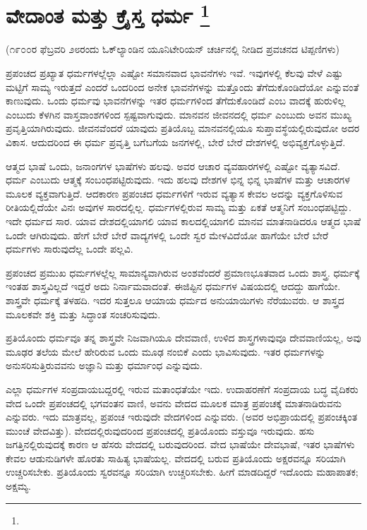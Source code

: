 
\chapter{ವೇದಾಂತ ಮತ್ತು ಕ್ರೈಸ್ತ ಧರ್ಮ \protect\footnote{}}

\begin{center}
(೧೯೦೦ರ ಫೆಬ್ರವರಿ ೨೮ರಂದು ಓಕ್‌ಲ್ಯಾಂಡಿನ ಯೂನಿಟೇರಿಯನ್ ಚರ್ಚಿನಲ್ಲಿ ನೀಡಿದ ಪ್ರವಚನದ ಟಿಪ್ಪಣಿಗಳು)
\end{center}

 ಪ್ರಪಂಚದ ಪ್ರಖ್ಯಾತ ಧರ್ಮಗಳಲ್ಲೆಲ್ಲಾ ಎಷ್ಟೋ ಸಮಾನವಾದ ಭಾವನೆಗಳು ಇವೆ. ಇವುಗಳಲ್ಲಿ ಕೆಲವು ವೇಳೆ ಎಷ್ಟು ಮಟ್ಟಿಗೆ ಸಾಮ್ಯ ಇರುತ್ತದೆ ಎಂದರೆ ಒಂದರಿಂದ ಅನೇಕ ಭಾವನೆಗಳನ್ನು ಮತ್ತೊಂದು ತೆಗೆದುಕೊಂಡಿದೆಯೋ ಎನ್ನುವಂತೆ ಕಾಣುವುದು. ಒಂದು ಧರ್ಮವು ಭಾವನೆಗಳನ್ನು ಇತರ ಧರ್ಮಗಳಿಂದ ತೆಗೆದುಕೊಂಡಿದೆ ಎಂಬ ವಾದಕ್ಕೆ ಹುರುಳಿಲ್ಲ ಎಂಬುದು ಕೆಳಗಿನ ವಾಸ್ತವಾಂಶಗಳಿಂದ ಸ್ಪಷ್ಟವಾಗುವುದು. ಮಾನವನ ಜೀವನದಲ್ಲಿ ಧರ್ಮ ಎಂಬುದು ಅವನ ಮುಖ್ಯ ಪ್ರವೃತ್ತಿಯಾಗಿರುವುದು. ಜೀವನವೆಂದರೆ ಯಾವುದು ಪ್ರತಿಯೊಬ್ಬ ಮಾನವನಲ್ಲಿಯೂ ಸುಪ್ತಾವಸ್ಥೆಯಲ್ಲಿರುವುದೋ ಅದರ ವಿಕಾಸ. ಆದುದರಿಂದ ಈ ಧರ್ಮ ಪ್ರವೃತ್ತಿ ಬಗೆಬಗೆಯ ಜನಗಳಲ್ಲಿ, ಬೇರೆ ಬೇರೆ ದೇಶಗಳಲ್ಲಿ ಅಭಿವ್ಯಕ್ತಗೊಳ್ಳುತ್ತಿದೆ.

ಆತ್ಮದ ಭಾಷೆ ಒಂದು, ಜನಾಂಗಗಳ ಭಾಷೆಗಳು ಹಲವು. ಅವರ ಆಚಾರ ವ್ಯವಹಾರಗಳಲ್ಲಿ ಎಷ್ಟೋ ವ್ಯತ್ಯಾಸವಿದೆ. ಧರ್ಮ ಎಂಬುದು ಆತ್ಮಕ್ಕೆ ಸಂಬಂಧಪಟ್ಟಿರುವುದು. ಇದು ಹಲವು ದೇಶಗಳ ಭಿನ್ನ ಭಿನ್ನ ಭಾಷೆಗಳ ಮತ್ತು ಆಚಾರಗಳ ಮೂಲಕ ವ್ಯಕ್ತವಾಗುತ್ತಿದೆ. ಆದಕಾರಣ ಪ್ರಪಂಚದ ಧರ್ಮಗಳಿಗೆ ಇರುವ ವ್ಯತ್ಯಾಸ ಕೇವಲ ಅದನ್ನು ವ್ಯಕ್ತಗೊಳಿಸುವ ರೀತಿಯಲ್ಲಿದೆಯೇ ವಿನಃ ಅವುಗಳ ಸಾರದಲ್ಲಿಲ್ಲ. ಧರ್ಮಗಳಲ್ಲಿರುವ ಸಾಮ್ಯ ಮತ್ತು ಏಕತೆ ಆತ್ಮನಿಗೆ ಸಂಬಂಧಪಟ್ಟಿದ್ದು. ಇದೇ ಧರ್ಮದ ಸಾರ. ಯಾವ ದೇಶದಲ್ಲಿಯಾಗಲಿ ಯಾವ ಕಾಲದಲ್ಲಿಯಾಗಲಿ ಮಾನವ ಮಾತನಾಡಿದರೂ ಆತ್ಮದ ಭಾಷೆ ಒಂದೇ ಆಗಿರುವುದು. ಹೇಗೆ ಬೇರೆ ಬೇರೆ ವಾದ್ಯಗಳಲ್ಲಿ ಒಂದೇ ಸ್ವರ ಮೇಳವಿದೆಯೋ ಹಾಗೆಯೇ ಬೇರೆ ಬೇರೆ ಧರ್ಮಗಳು ಸಾರುವುದೆಲ್ಲ ಒಂದೇ ಪಲ್ಲವಿ.

ಪ್ರಪಂಚದ ಪ್ರಮುಖ ಧರ್ಮಗಳಲ್ಲೆಲ್ಲ ಸಾಮಾನ್ಯವಾಗಿರುವ ಅಂಶವೆಂದರೆ ಪ್ರಮಾಣಭೂತವಾದ ಒಂದು ಶಾಸ್ತ್ರ. ಧರ್ಮಕ್ಕೆ ಇಂತಹ ಶಾಸ್ತ್ರವಿಲ್ಲದೆ ಇದ್ದರೆ ಅದು ನಿರ್ನಾಮವಾದಂತೆ. ಈಜಿಪ್ಟಿನ ಧರ್ಮಗಳ ವಿಷಯದಲ್ಲಿ ಆದದ್ದು ಹಾಗೆಯೇ. ಶಾಸ್ತ್ರವೇ ಧರ್ಮಕ್ಕೆ ತಳಹದಿ. ಇದರ ಸುತ್ತಲೂ ಆಯಾಯ ಧರ್ಮದ ಅನುಯಾಯಿಗಳು ನೆರೆಯುವರು. ಆ ಶಾಸ್ತ್ರದ ಮೂಲಕವೇ ಶಕ್ತಿ ಮತ್ತು ಸಿದ್ಧಾಂತ ಸಂಚರಿಸುವುದು.

ಪ್ರತಿಯೊಂದು ಧರ್ಮವೂ ತನ್ನ ಶಾಸ್ತ್ರವೇ ನಿಜವಾಗಿಯೂ ದೇವವಾಣಿ, ಉಳಿದ ಶಾಸ್ತ್ರಗಳಾವುವೂ ದೇವವಾಣಿಯಲ್ಲ, ಅವು ಮೂಢರ ತಲೆಯ ಮೇಲೆ ಹೇರಿರುವ ಒಂದು ಮೂಢ ನಂಬಿಕೆ ಎಂದು ಭಾವಿಸುವುದು. ಇತರ ಧರ್ಮಗಳನ್ನು ಅನುಸರಿಸುತ್ತಿರುವವನು ಅಜ್ಞಾನಿ ಮತ್ತು ಧರ್ಮಾಂಧ ಎನ್ನುವುದು.

ಎಲ್ಲಾ ಧರ್ಮಗಳ ಸಂಪ್ರದಾಯಬದ್ದರಲ್ಲಿ ಇರುವ ಮತಾಂಧತೆಯೇ ಇದು. ಉದಾಹರಣೆಗೆ ಸಂಪ್ರದಾಯ ಬದ್ಧ ವೈದಿಕರು ವೇದ ಒಂದೇ ಪ್ರಪಂಚದಲ್ಲಿ ಭಗವಂತನ ವಾಣಿ, ಅವನು ವೇದದ ಮೂಲಕ ಮಾತ್ರ ಪ್ರಪಂಚಕ್ಕೆ ಮಾತನಾಡಿರುವನು ಎನ್ನುವರು. ಇದು ಮಾತ್ರವಲ್ಲ, ಪ್ರಪಂಚ ಇರುವುದೇ ವೇದಗಳಿಂದ ಎನ್ನುವರು. (ಅವರ ಅಭಿಪ್ರಾಯದಲ್ಲಿ ಪ್ರಪಂಚಕ್ಕಿಂತ ಮುಂಚೆ ವೇದವಿತ್ತು). ವೇದದಲ್ಲಿರುವುದರಿಂದ ಪ್ರಪಂಚದಲ್ಲಿ ಪ್ರತಿಯೊಂದು ವಸ್ತುವೂ ಇರುವುದು. ಹಸು ಜಗತ್ತಿನಲ್ಲಿರುವುದಕ್ಕೆ ಕಾರಣ ಆ ಹೆಸರು ವೇದದಲ್ಲಿ ಬರುವುದರಿಂದ. ವೇದ ಭಾಷೆಯೇ ದೇವಭಾಷೆ, ಇತರ ಭಾಷೆಗಳು ಕೇವಲ ಆಡುನುಡಿಗಳೇ ಹೊರತು ಸಾಹಿತ್ಯ ಭಾಷೆಯಲ್ಲ. ವೇದದಲ್ಲಿ ಬರುವ ಪ್ರತಿಯೊಂದು ಅಕ್ಷರವನ್ನೂ ಸರಿಯಾಗಿ ಉಚ್ಚರಿಸಬೇಕು. ಪ್ರತಿಯೊಂದು ಸ್ವರವನ್ನೂ ಸರಿಯಾಗಿ ಉಚ್ಚರಿಸಬೇಕು. ಹೀಗೆ ಮಾಡದಿದ್ದರೆ ಇದೊಂದು ಮಹಾಪಾತಕ; ಅಕ್ಷಮ್ಯ.


